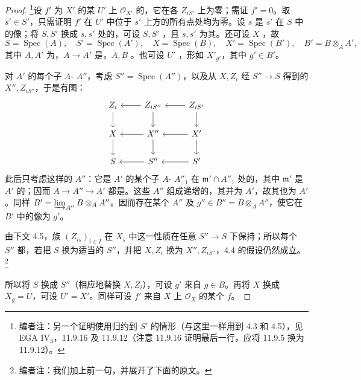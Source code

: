 \begin{proof}
\footnote{编者注：另一个证明使用归约到 $S'$ 的情形（与这里一样用到 4.3 和 4.5），见 EGA IV$_3$，11.9.16 及 11.9.12（注意 11.9.16 证明最后一行，应将 11.9.5 换为 11.9.12）。}设 $f'$ 为 $X'$ 的某 $U'$ 上 $\mathcal O_{X'}$ 的，它在各 $Z_{iS'}$ 上为零；需证 $f'=0$。取 $s'\in S'$，只需证明 $f'$ 在 $U'$ 中位于 $s'$ 上方的所有点处均为零。设 $s$ 是 $s'$ 在 $S$ 中的像；将 $S,S'$ 换成 $s,s'$ 处的，可设 $S,S'$ ，且 $s,s'$ 为其。还可设 $X$ ，故
\[S=\operatorname{Spec}(A),\quad S'=\operatorname{Spec}(A'),\quad X=\operatorname{Spec}(B),\quad X'=\operatorname{Spec}(B'),\quad B'=B\otimes_A A',\]
其中 $A,A'$ 为，$A\to A'$ 是，$A,B$ 。也可设 $U'$ ，形如 $X'_{g'}$，其中 $g'\in B'$。

对 $A'$ 的每个子 $A$- $A''$，考虑 $S''=\operatorname{Spec}(A'')$，以及从 $X,Z_i$ 经 $S''\to S$ 得到的 $X'',Z_{iS''}$，于是有图：
\[
\begin{tikzcd}
Z_i\arrow[d]&Z_{iS''}\arrow[l]\arrow[d]&Z_{iS'}\arrow[l]\arrow[d]\\
X\arrow[d]&X''\arrow[l]\arrow[d]&X'\arrow[l]\arrow[d]\\
S&S''\arrow[l]&S'\arrow[l]
\end{tikzcd}
\]
此后只考虑这样的 $A''$：它是 $A'$ 的某个子 $A$- $A''_1$ 在 $\mathfrak m'\cap A''_1$ 处的，其中 $\mathfrak m'$ 是 $A'$ 的；因而 $A\to A''\to A'$ 都是。这些 $A''$ 组成递增的，其并为 $A'$，故其也为 $A'$。同样 $B'=\varinjlim_{A''}B\otimes_A A''$。因而存在某个 $A''$ 及 $g''\in B''=B\otimes_A A''$，使它在 $B'$ 中的像为 $g'$。

由下文 4.5，族 $(Z_{is})_{i\in I}$ 在 $X_s$ 中这一性质在任意 $S''\to S$ 下保持；所以每个 $S''$ 都，若把 $S$ 换为适当的 $S''$，并把 $X,Z_i$ 换为 $X'',Z_{iS''}$，4.4 的假设仍然成立。\footnote{编者注：我们加上前一句，并展开了下面的原文。}

所以将 $S$ 换成 $S''$（相应地替换 $X,Z_i$），可设 $g'$ 来自 $g\in B$。再将 $X$ 换成 $X_g=U$，可设 $U'=X'$。同样可设 $f'$ 来自 $X$ 上 $\mathcal O_X$ 的某个 $f$。


\end{proof}
